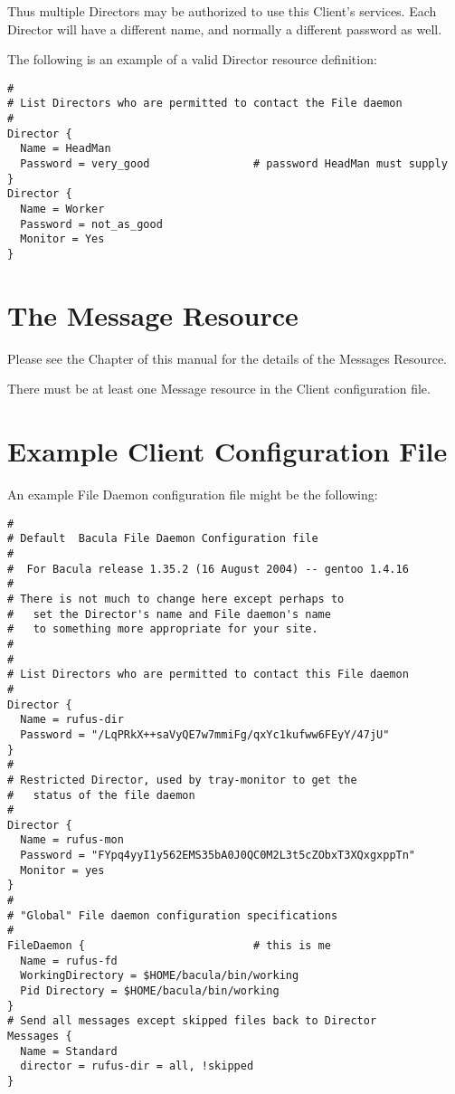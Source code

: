 Thus multiple Directors may be authorized to use this Client's services. Each
Director will have a different name, and normally a different password as
well. 

The following is an example of a valid Director resource definition: 

\footnotesize
\begin{verbatim}
#
# List Directors who are permitted to contact the File daemon
#
Director {
  Name = HeadMan
  Password = very_good                # password HeadMan must supply
}
Director {
  Name = Worker
  Password = not_as_good
  Monitor = Yes
}
\end{verbatim}
\normalsize

\section{The Message Resource}
\label{MessagesResource3}

Please see the 
 Chapter of this
manual for the details of the Messages Resource. 

There must be at least one Message resource in the Client configuration file. 

\section{Example Client Configuration File}
\label{SampleClientConfiguration}

An example File Daemon configuration file might be the following: 

\footnotesize
\begin{verbatim}
#
# Default  Bacula File Daemon Configuration file
#
#  For Bacula release 1.35.2 (16 August 2004) -- gentoo 1.4.16
#
# There is not much to change here except perhaps to
#   set the Director's name and File daemon's name
#   to something more appropriate for your site.
#
#
# List Directors who are permitted to contact this File daemon
#
Director {
  Name = rufus-dir
  Password = "/LqPRkX++saVyQE7w7mmiFg/qxYc1kufww6FEyY/47jU"
}
#
# Restricted Director, used by tray-monitor to get the
#   status of the file daemon
#
Director {
  Name = rufus-mon
  Password = "FYpq4yyI1y562EMS35bA0J0QC0M2L3t5cZObxT3XQxgxppTn"
  Monitor = yes
}
#
# "Global" File daemon configuration specifications
#
FileDaemon {                          # this is me
  Name = rufus-fd
  WorkingDirectory = $HOME/bacula/bin/working
  Pid Directory = $HOME/bacula/bin/working
}
# Send all messages except skipped files back to Director
Messages {
  Name = Standard
  director = rufus-dir = all, !skipped
}
\end{verbatim}
\normalsize
